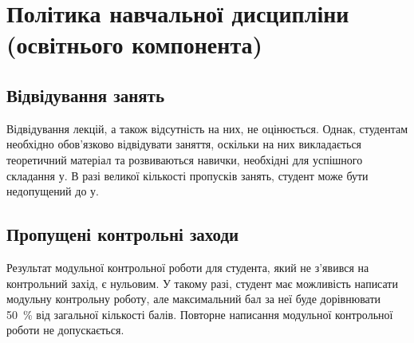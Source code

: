 \documentclass{Syllabus}
\begin{document}

\section{Політика навчальної дисципліни (освітнього компонента)}


\subsection*{Відвідування занять}
Відвідування лекцій, а також відсутність на них, не оцінюється. Однак, студентам необхідно обов'язково відвідувати заняття, оскільки на них викладається теоретичний матеріал та розвиваються навички, необхідні для успішного складання \control у. В разі великої кількості пропусків занять, студент може бути недопущений до \control у.

\subsection*{Пропущені контрольні заходи}

Результат модульної контрольної роботи для студента, який не з’явився на контрольний захід, є нульовим. У такому разі, студент має можливість написати модульну контрольну роботу, але максимальний бал за неї буде дорівнювати 50~\% від загальної кількості балів. Повторне написання модульної контрольної роботи не допускається.
\end{document}

